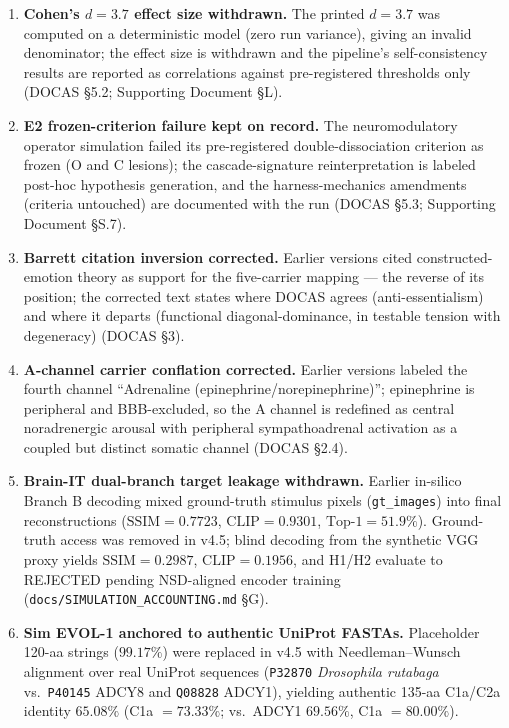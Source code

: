\documentclass[11pt]{article}
\begin{document}
\begin{enumerate}
must be printed in the Supporting Document (SIM-R2 battery 3; GTT \S{}3.1,
\S{}7(viii)).
\item \textbf{Cohen's $d = 3.7$ effect size withdrawn.} The printed $d = 3.7$
was computed on a deterministic model (zero run variance), giving an invalid
denominator; the effect size is withdrawn and the pipeline's self-consistency
results are reported as correlations against pre-registered thresholds only
(DOCAS \S{}5.2; Supporting Document \S{}L).
\item \textbf{E2 frozen-criterion failure kept on record.} The neuromodulatory
operator simulation failed its pre-registered double-dissociation criterion as
frozen (O and C lesions); the cascade-signature reinterpretation is labeled
post-hoc hypothesis generation, and the harness-mechanics amendments
(criteria untouched) are documented with the run (DOCAS \S{}5.3; Supporting Document \S{}S.7).
\item \textbf{Barrett citation inversion corrected.} Earlier versions cited
constructed-emotion theory as support for the five-carrier mapping --- the
reverse of its position; the corrected text states where DOCAS agrees
(anti-essentialism) and where it departs (functional diagonal-dominance, in
testable tension with degeneracy) (DOCAS \S{}3).
\item \textbf{A-channel carrier conflation corrected.} Earlier versions labeled
the fourth channel ``Adrenaline (epinephrine/norepinephrine)''; epinephrine is
peripheral and BBB-excluded, so the A channel is redefined as central
noradrenergic arousal with peripheral sympathoadrenal activation as a coupled
but distinct somatic channel (DOCAS \S{}2.4).
\item \textbf{Brain-IT dual-branch target leakage withdrawn.} Earlier in-silico Branch B decoding mixed ground-truth stimulus pixels (\texttt{gt\_images}) into final reconstructions ($\text{SSIM} = 0.7723$, $\text{CLIP} = 0.9301$, $\text{Top-1} = 51.9\%$). Ground-truth access was removed in v4.5; blind decoding from the synthetic VGG proxy yields $\text{SSIM} = 0.2987$, $\text{CLIP} = 0.1956$, and H1/H2 evaluate to REJECTED pending NSD-aligned encoder training (\texttt{docs/SIMULATION\_ACCOUNTING.md} \S{}G).
\item \textbf{Sim EVOL-1 anchored to authentic UniProt FASTAs.} Placeholder 120-aa strings ($99.17\%$) were replaced in v4.5 with Needleman--Wunsch alignment over real UniProt sequences (\texttt{P32870} \emph{Drosophila rutabaga} vs.\ \texttt{P40145} ADCY8 and \texttt{Q08828} ADCY1), yielding authentic 135-aa C1a/C2a identity $65.08\%$ (C1a $= 73.33\%$; vs.\ ADCY1 $69.56\%$, C1a $= 80.00\%$).

\end{enumerate}
\end{document}
